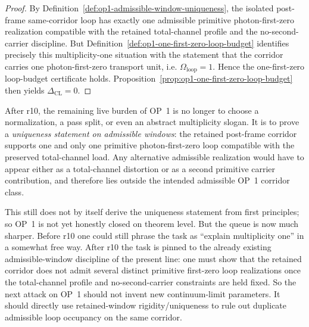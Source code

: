 \begin{proof}
By Definition~\ref{def:op1-admissible-window-uniqueness}, the isolated post-frame same-corridor loop has exactly one admissible primitive photon-first-zero realization compatible with the retained total-channel profile and the no-second-carrier discipline. But Definition~\ref{def:op1-one-first-zero-loop-budget} identifies precisely this multiplicity-one situation with the statement that the corridor carries one photon-first-zero transport unit, i.e. \(\Omega_{\mathrm{loop}}=1\). Hence the one-first-zero loop-budget certificate holds. Proposition~\ref{prop:op1-one-first-zero-loop-budget} then yields \(\Delta_{\mathrm{CL}}=0\).
\end{proof}

\begin{corollary}
\label{cor:op1-live-burden-after-r10}
After r10, the remaining live burden of OP~1 is no longer to choose a normalization, a pass split, or even an abstract multiplicity slogan. It is to prove a \emph{uniqueness statement on admissible windows}: the retained post-frame corridor supports one and only one primitive photon-first-zero loop compatible with the preserved total-channel load. Any alternative admissible realization would have to appear either as a total-channel distortion or as a second primitive carrier contribution, and therefore lies outside the intended admissible OP~1 corridor class.
\end{corollary}

\begin{remark}
This still does not by itself derive the uniqueness statement from first principles; so OP~1 is not yet honestly closed on theorem level. But the queue is now much sharper. Before r10 one could still phrase the task as ``explain multiplicity one'' in a somewhat free way. After r10 the task is pinned to the already existing admissible-window discipline of the present line: one must show that the retained corridor does not admit several distinct primitive first-zero loop realizations once the total-channel profile and no-second-carrier constraints are held fixed. So the next attack on OP~1 should not invent new continuum-limit parameters. It should directly use retained-window rigidity/uniqueness to rule out duplicate admissible loop occupancy on the same corridor.
\end{remark}


